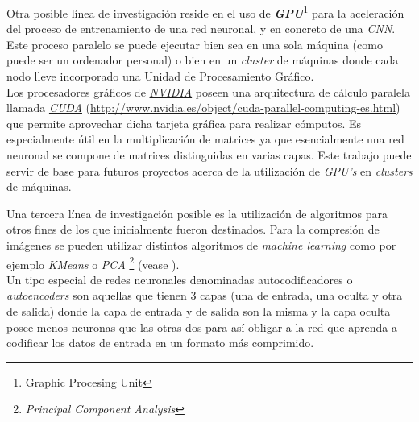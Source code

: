 Otra posible línea de investigación reside en el uso de \textbf{\textit{GPU}}\footnote{Graphic Procesing 
Unit} para la aceleración del proceso de entrenamiento de una red neuronal, y en concreto 
de una \textit{CNN}. 
Este proceso paralelo se puede ejecutar bien sea en una sola máquina (como puede ser un ordenador personal) 
o bien en un \textit{cluster} de máquinas donde cada nodo lleve incorporado una Unidad de Procesamiento Gráfico. \\
Los procesadores gráficos de \href{http://www.nvidia.es/page/home.html}{\textit{NVIDIA}} poseen una 
arquitectura de cálculo paralela llamada \href{http://www.nvidia.es/object/cuda-parallel-computing-es.html}{\textit{CUDA}}
(\url{http://www.nvidia.es/object/cuda-parallel-computing-es.html})
 que permite aprovechar dicha tarjeta gráfica para realizar cómputos. Es especialmente útil en la multiplicación 
de matrices ya que esencialmente una red neuronal se compone de matrices distinguidas en varias capas.
Este trabajo puede servir de base para futuros proyectos acerca de la utilización de \textit{GPU's} en 
\textit{clusters} de máquinas.
\newline

Una tercera línea de investigación posible es la utilización de algoritmos para otros fines de los que
inicialmente fueron destinados. Para la compresión de imágenes se pueden utilizar distintos algoritmos de
\textit{machine learning} como por ejemplo \textit{KMeans} o \textit{PCA}
\footnote{\textit{Principal Component Analysis}} (vease \cite{DBLP:books/lib/HastieTF09}).\\
Un tipo especial de redes neuronales denominadas autocodificadores o \textit{autoencoders} son aquellas que
tienen 3 capas (una de entrada, una oculta y otra de salida) donde la capa de entrada y de salida son la misma
y la capa oculta posee menos neuronas que las otras dos para así obligar a la red que aprenda a codificar los
datos de entrada en un formato más comprimido.


\clearpage

